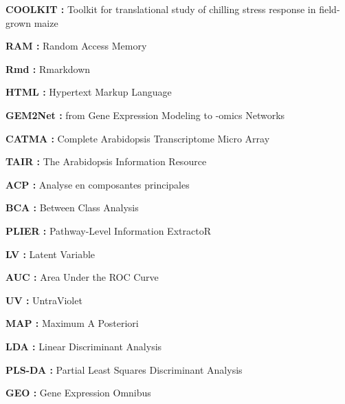 \documentclass[twoside]{article}
\renewcommand{\thepage}{}
\begin{document}
\vspace{0.5cm}\textbf{COOLKIT : }Toolkit for translational study of chilling stress response in field-grown maize

\vspace{0.5cm}\textbf{RAM : }Random Access Memory

\vspace{0.5cm}\textbf{Rmd : }Rmarkdown

\vspace{0.5cm}\textbf{HTML : }Hypertext Markup Language

\vspace{0.5cm}\textbf{GEM2Net : }from Gene Expression Modeling to -omics Networks

\vspace{0.5cm}\textbf{CATMA : }Complete Arabidopsis Transcriptome Micro Array

\vspace{0.5cm}\textbf{TAIR : }The Arabidopsis Information Resource

\vspace{0.5cm}\textbf{ACP : }Analyse en composantes principales

\vspace{0.5cm}\textbf{BCA : }Between Class Analysis

\vspace{0.5cm}\textbf{PLIER : }Pathway-Level Information ExtractoR

\vspace{0.5cm}\textbf{LV : }Latent Variable

\vspace{0.5cm}\textbf{AUC : }Area Under the ROC Curve

\vspace{0.5cm}\textbf{UV : }UntraViolet

\vspace{0.5cm}\textbf{MAP : }Maximum A Posteriori

\vspace{0.5cm}\textbf{LDA : }Linear Discriminant Analysis

\vspace{0.5cm}\textbf{PLS-DA : }Partial Least Squares Discriminant Analysis

\vspace{0.5cm}\textbf{GEO : }Gene Expression Omnibus


\newpage
\thispagestyle{empty}
~

\newpage
\renewcommand{\thepage}{\arabic{page}}
\setcounter{page}{1}
\setcounter{section}{0}
\end{document}

